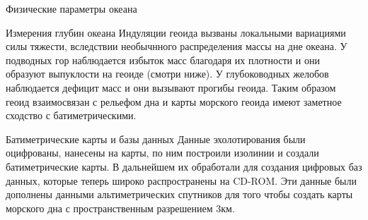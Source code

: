 \begin{chapter}{Физические параметры океана}
\begin{section}{Измерения глубин океана}
Индуляции геоида вызваны локальными вариациями силы тяжести,
вследствии необычнного распределения массы на дне океана. У подводных
гор наблюдается избыток масс благодаря их плотности и они образуют
выпуклости на геоиде (смотри ниже). У глубоководных желобов
наблюдается дефицит масс и они вызывают прогибы геоида. Таким образом
геоид взаимосвязан с рельефом дна и карты морского геоида имеют
заметное сходство с батиметрическими.
%




\end{section}

\begin{section}{Батиметрические карты и базы данных}
Данные эхолотирования были оцифрованы, нанесены на карты, по ним
построили изолинии и создали батиметрические карты. В дальнейшем их
обработали для создания цифровых баз данных, которые теперь широко
распространены на CD-ROM. Эти данные были дополнены данными
альтиметрических спутников для того чтобы создать карты морского дна с
пространственным разрешением 3км.
%


\end{section}
\end{chapter}
